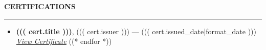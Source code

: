 \documentclass[11pt,letterpaper]{article}
\newenvironment{rSectionRight}[1]{%
  \sectionskip
  \MakeUppercase{{\bfseries #1}}%
  \sectionlineskip
  \hrule
  \begin{list}{}{%
    \setlength{\leftmargin}{0em}%
  }
  \item[]
}{%
  \end{list}
}
\def\sectionlineskip{\medskip} %
\def\sectionskip{\medskip} %
\begin{document}
\begin{multicols}{2}
\begin{rSectionRight}{CERTIFICATIONS}
\begin{itemize}[leftmargin=*]
((* for cert in certificates *))
    \item \textbf{((( cert.title )))}, ((( cert.issuer ))) — ((( cert.issued_date|format_date )))
    \newline \href{((( cert.link )))}{\textit{View Certificate}}
((* endfor *))
\end{itemize}
\end{rSectionRight}

\end{multicols}
\end{document}
